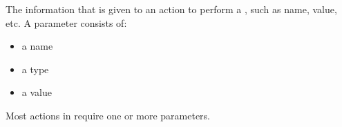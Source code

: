 \item[Parameters]{
The information that is given to an action to perform a \gdstep{}, such as
 name, value, etc.
A parameter consists of:
\begin{itemize}
\item a name
\item a type 
\item a value
\end{itemize}
Most actions in \GD require one or more parameters.
}
